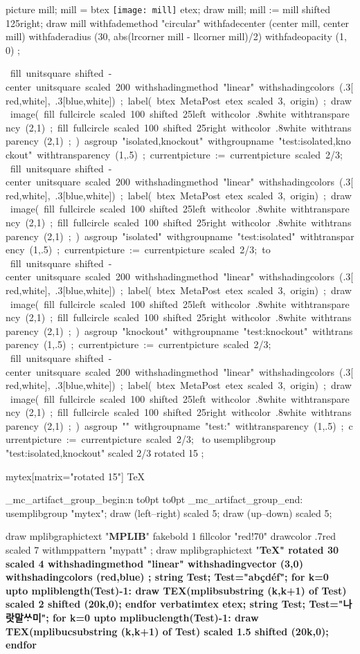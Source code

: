 \documentclass{article}
\begin{document}
\leavevmode
\mpfig[alt=test fading]
  picture mill; mill = btex \texttt{[image: mill]} etex;
  draw mill;
  mill := mill shifted 125right;
  draw mill
    withfademethod "circular"
    withfadecenter (center mill, center mill)
    withfaderadius (30, abs(lrcorner mill - llcorner mill)/2)
    withfadeopacity (1, 0)
    ;
\endmpfig

\def\test#1{%
  \mpfig
  fill unitsquare shifted -center unitsquare scaled 200
    withshadingmethod "linear"
    withshadingcolors (.3[red,white], .3[blue,white])
    ;
  label( btex MetaPost etex scaled 3, origin) ;
  draw image(
    fill fullcircle scaled 100 shifted 25left
      withcolor .8white
      withtransparency (2,1)
      ;
    fill fullcircle scaled 100 shifted 25right
      withcolor .8white
      withtransparency (2,1)
      ;
  )
  asgroup "#1"
  withgroupname "test:#1"
  withtransparency (1,.5)
  ;
  currentpicture := currentpicture scaled 2/3;
  \endmpfig
}%
\hbox{\test{isolated,knockout}\,\test{isolated}\vbox to}%
\hbox{\test{knockout}\,\test{}}%
\hbox to%
\leavevmode
\mpfig usemplibgroup "test:isolated,knockout" scaled 2/3 rotated 15 ; \endmpfig
{}%
\begin{mplibgroup}{mytex}[matrix="rotated 15"] \SuspendTagging{}\TeX \end{mplibgroup}%
\ExplSyntaxOn
\tag_mc_artifact_group_begin:n {}
\ExplSyntaxOff
\hbox to0pt{\hss\vrule width.5pt height5pt depth5pt\hss}%
\hbox to0pt{\hss\vrule width10pt height.25pt depth.25pt\hss}%
\ExplSyntaxOn
\tag_mc_artifact_group_end:
\ExplSyntaxOff
{}%
\mpfig[actualtext=TeX] usemplibgroup "mytex"; draw (left--right) scaled 5; draw (up--down) scaled 5; \endmpfig

\mpfig[text]
  draw mplibgraphictext "\textbf{MPLIB}"
    fakebold 1 fillcolor "red!70" drawcolor .7red scaled 7
    withmppattern "mypatt" ;
\endmpfig
\mpfig[text]
  draw mplibgraphictext "\bfseries\TeX" rotated 30 scaled 4
    withshadingmethod "linear"
    withshadingvector (3,0)
    withshadingcolors (red,blue)
    ;
\endmpfig
\leavevmode
\mpfig[off]
  string Test; Test="abçdéf";
  for k=0 upto mpliblength(Test)-1:
    draw TEX(mplibsubstring (k,k+1) of Test) scaled 2 shifted (20k,0);
  endfor
\endmpfig
\qquad
{}%
\mpfig[actualtext=나랏말씀이]
  verbatimtex \hangulfont etex;
  string Test; Test="나랏말ᄊᆞ미";
  for k=0 upto mplibuclength(Test)-1:
    draw TEX(mplibucsubstring (k,k+1) of Test) scaled 1.5 shifted (20k,0);
  endfor
\endmpfig
\end{document}
